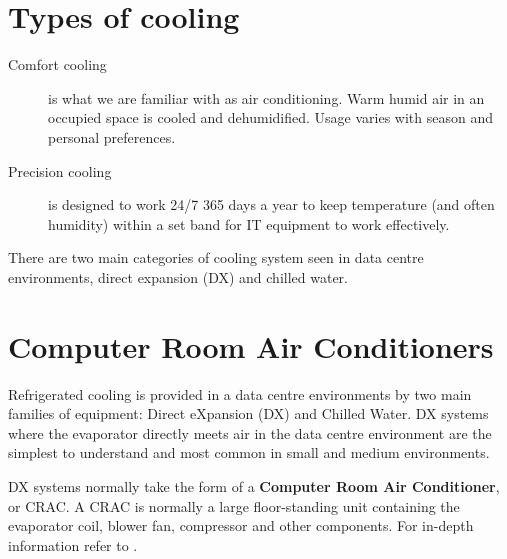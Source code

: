 \documentclass{pgnotes}
\begin{document}
\section{Types of cooling}

\begin{description}
\item[Comfort cooling] is what we are familiar with as air conditioning. Warm humid air in an occupied space is cooled and dehumidified. Usage varies with season and personal preferences.
\item[Precision cooling] is designed to work 24/7 365 days a year to keep temperature (and often humidity) within a set band for IT equipment to work effectively. 
\end{description}

There are two main categories of cooling system seen in data centre environments, direct expansion (DX) and chilled water.

\newpage

\section{Computer Room Air Conditioners}

Refrigerated cooling is provided in a data centre environments by two main families of equipment: Direct eXpansion (DX) and Chilled Water.
DX systems where the evaporator directly meets air in the data centre environment are the simplest to understand and most common in small and medium environments.

DX systems normally take the form of a \textbf{Computer Room Air Conditioner}, or CRAC.
A CRAC is normally a large floor-standing unit containing the evaporator coil, blower fan, compressor and other components.
For in-depth information refer to \citet{evans:2012:the-different}.

\end{document}
